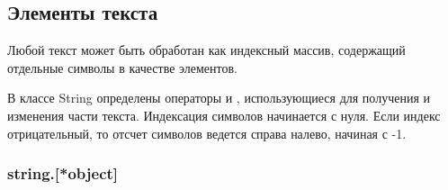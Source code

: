 \subsection*{Элементы текста}

Любой текст может быть обработан как индексный массив, содержащий отдельные символы в качестве элементов. 

В классе String определены операторы \method{[]} и \method{[]=}, использующиеся для получения и изменения части текста. Индексация символов начинается с нуля. Если индекс отрицательный, то отсчет символов ведется справа налево, начиная с -1.

\subsubsection*{string.[*object]}



